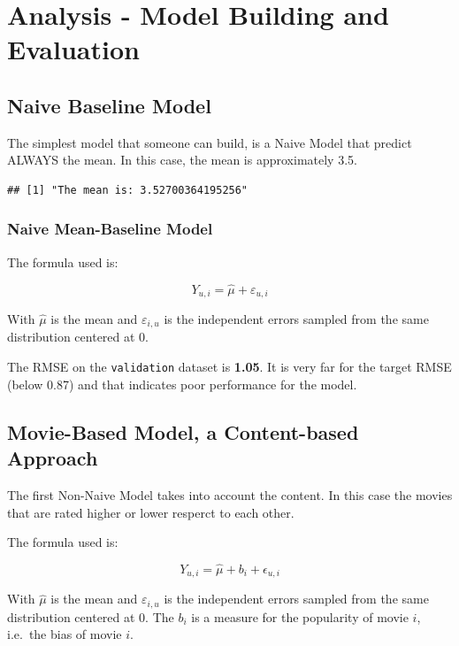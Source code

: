 \documentclass[
]{article}
\begin{document}
\hypertarget{analysis---model-building-and-evaluation}{%
\section{Analysis - Model Building and
Evaluation}\label{analysis---model-building-and-evaluation}}

\hypertarget{naive-baseline-model}{%
\subsection{Naive Baseline Model}\label{naive-baseline-model}}

The simplest model that someone can build, is a Naive Model that predict
ALWAYS the mean. In this case, the mean is approximately 3.5.

\begin{verbatim}
## [1] "The mean is: 3.52700364195256"
\end{verbatim}

\hypertarget{naive-mean-baseline-model}{%
\subsubsection{Naive Mean-Baseline
Model}\label{naive-mean-baseline-model}}

The formula used is:

\[Y_{u,i} = \hat{\mu} + \varepsilon_{u,i}\]

With \(\hat{\mu}\) is the mean and \(\varepsilon_{i,u}\) is the
independent errors sampled from the same distribution centered at 0.

The RMSE on the \texttt{validation} dataset is \textbf{1.05}. It is very
far for the target RMSE (below 0.87) and that indicates poor performance
for the model.

\hypertarget{movie-based-model-a-content-based-approach}{%
\subsection{Movie-Based Model, a Content-based
Approach}\label{movie-based-model-a-content-based-approach}}

The first Non-Naive Model takes into account the content. In this case
the movies that are rated higher or lower resperct to each other.

The formula used is:

\[Y_{u,i} = \hat{\mu} + b_i + \epsilon_{u,i}\]

With \(\hat{\mu}\) is the mean and \(\varepsilon_{i,u}\) is the
independent errors sampled from the same distribution centered at 0. The
\(b_i\) is a measure for the popularity of movie \(i\), i.e.~the bias of
movie \(i\).
\end{document}
